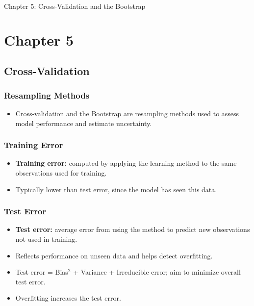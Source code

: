\documentclass{article}
\begin{document}
\pagebreak

\begin{center}
    \Large{Chapter 5: Cross-Validation and the Bootstrap}
\end{center}

\section{Chapter 5}

\subsection{Cross-Validation}

\subsubsection{Resampling Methods}
\begin{itemize}
    \item Cross-validation and the Bootstrap are resampling methods used to assess model performance and estimate uncertainty.
\end{itemize}

\subsubsection{Training Error}
\begin{itemize}
    \item \textbf{Training error:} computed by applying the learning method to the same observations used for training.
    \item Typically lower than test error, since the model has seen this data.
\end{itemize}

\subsubsection{Test Error}
\begin{itemize}
    \item \textbf{Test error:} average error from using the method to predict new observations not used in training.
    \item Reflects performance on unseen data and helps detect overfitting.
    \item Test error = Bias$^2$ + Variance + Irreducible error; aim to minimize overall test error.
    \item Overfitting increases the test error.
\end{itemize}
\end{document}
